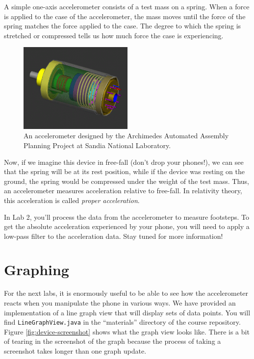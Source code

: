 \documentclass[10pt]{article}
\begin{document}
A simple one-axis accelerometer consists of a test mass on a spring. When a force is applied to the case of the accelerometer, the mass moves until the force of the spring matches the force applied to the case. The degree to which the spring is stretched or compressed tells us how much force the case is experiencing.

\begin{figure}[h]
\begin{center}\includegraphics[width=0.5\textwidth]{Accelerometer.png}\end{center}
\caption{\label{fig:accelerometer}An accelerometer designed by the Archimedes Automated Assembly Planning Project at Sandia National Laboratory.}
\end{figure}

Now, if we imagine this device in free-fall (don't drop your phones!), we can see that the spring will be at its rest position, while if the device was resting on the ground, the spring would be compressed under the weight of the test mass. Thus, an accelerometer measures acceleration relative to free-fall. In relativity theory, this acceleration is called \emph{proper acceleration}. 

In Lab 2, you'll process the data from the accelerometer to measure footsteps. To get the absolute acceleration experienced by your phone, you will need to apply a low-pass filter to the acceleration data. Stay tuned for more information!

\section{Graphing}
For the next labs, it is enormously useful to be able to see how the accelerometer reacts when you manipulate the phone in various ways. We have provided an implementation of a line graph view that will display sets of data points. You will find {\tt LineGraphView.java} in the ``materials'' directory of the course repository. Figure \ref{fig:device-screenshot} shows what the graph view looks like. There is a bit of tearing in the screenshot of the graph because the process of taking a screenshot takes longer than one graph update.
\end{document}

